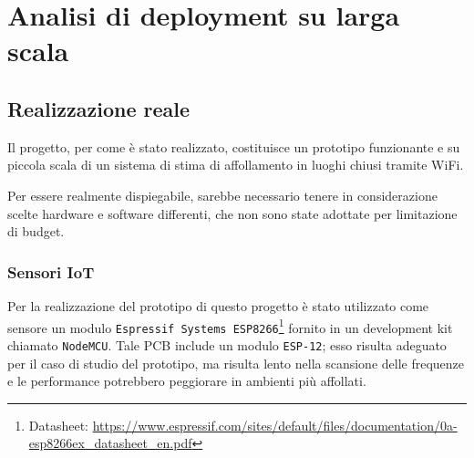 \section{Analisi di deployment su larga scala}




\subsection{Realizzazione reale}

Il progetto, per come è stato realizzato, costituisce un prototipo funzionante e su piccola scala di un sistema di stima di affollamento in luoghi chiusi tramite WiFi.

Per essere realmente dispiegabile, sarebbe necessario tenere in considerazione scelte hardware e software differenti, che non sono state adottate per limitazione di budget.

\subsubsection{Sensori IoT}\label{subsub:deploy:real:iot}

Per la realizzazione del prototipo di questo progetto è stato utilizzato come sensore un modulo \texttt{Espressif Systems ESP8266}\footnote{Datasheet: \url{https://www.espressif.com/sites/default/files/documentation/0a-esp8266ex_datasheet_en.pdf}} fornito in un development kit chiamato \texttt{NodeMCU}.
Tale PCB include un modulo \texttt{ESP-12};
esso risulta adeguato per il caso di studio del prototipo, ma risulta lento nella scansione delle frequenze e le performance potrebbero peggiorare in ambienti più affollati.

